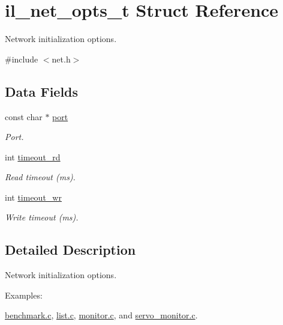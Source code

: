 \hypertarget{structil__net__opts__t}{}\section{il\+\_\+net\+\_\+opts\+\_\+t Struct Reference}
\label{structil__net__opts__t}


Network initialization options.  




{\ttfamily \#include $<$net.\+h$>$}

\subsection*{Data Fields}
\begin{DoxyCompactItemize}
\item 
const char $\ast$ \hyperlink{structil__net__opts__t_a8b65ee2151ffc84031d96eec857a0189}{port}
\begin{DoxyCompactList}\small\item\em Port. \end{DoxyCompactList}\item 
int \hyperlink{structil__net__opts__t_a1fe07477ccaae61b81dd71b2cf4bde08}{timeout\+\_\+rd}
\begin{DoxyCompactList}\small\item\em Read timeout (ms). \end{DoxyCompactList}\item 
int \hyperlink{structil__net__opts__t_a63e3d6b10ac90e08d629ac4458505d1a}{timeout\+\_\+wr}
\begin{DoxyCompactList}\small\item\em Write timeout (ms). \end{DoxyCompactList}\end{DoxyCompactItemize}


\subsection{Detailed Description}
Network initialization options. 

\begin{Desc}
\item[Examples\+: ]\par
\hyperlink{benchmark_8c-example}{benchmark.\+c}, \hyperlink{list_8c-example}{list.\+c}, \hyperlink{monitor_8c-example}{monitor.\+c}, and \hyperlink{servo_monitor_8c-example}{servo\+\_\+monitor.\+c}.\end{Desc}


